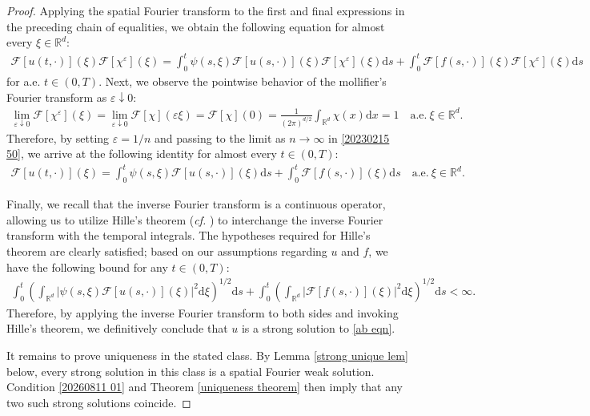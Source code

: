 \documentclass[11pt,reqno]{amsart}
\theoremstyle{definition}
\theoremstyle{remark}
\newcommand\bR{\mathbb{R}}
\newcommand\cF{\mathcal{F}}
\numberwithin{equation}{section}
\begin{document}
\begin{proof}
Applying the spatial Fourier transform to the first and final expressions in the preceding chain of equalities, we obtain the following equation for almost every $\xi \in \bR^d$:
\begin{align}
								\label{20230215 50}
\cF[u(t,\cdot)](\xi) \cF[\chi^\varepsilon](\xi)
= \int_0^t \psi(s,\xi) \cF[u(s,\cdot)](\xi)  \cF[\chi^\varepsilon](\xi) \mathrm{d}s 
+\int_0^t  \cF[f(s,\cdot)](\xi)  \cF[\chi^\varepsilon](\xi) \mathrm{d}s 
\end{align}
for a.e. $t \in (0,T)$.
Next, we observe the pointwise behavior of the mollifier's Fourier transform as $\varepsilon \downarrow 0$:
\begin{align*}
\lim_{\varepsilon \downarrow 0}\cF[\chi^\varepsilon](\xi)
=\lim_{\varepsilon \downarrow 0}\cF[\chi](\varepsilon \xi)= \cF[\chi](0)= \frac{1}{(2\pi)^{d/2}} \int_{\bR^d}\chi(x)\mathrm{d}x=1 \quad \text{a.e.}~ \xi \in \bR^d.
\end{align*}
Therefore, by setting $\varepsilon=1/n$ and passing to the limit as $n \to \infty$ in \eqref{20230215 50}, we arrive at the following identity for almost every $t \in (0,T)$:
\begin{align*}
\cF[u(t,\cdot)](\xi)
=\int_0^t \psi(s,\xi) \cF[u(s,\cdot)](\xi) \mathrm{d}s 
+\int_0^t  \cF[f(s,\cdot)](\xi) \mathrm{d}s 
\quad \text{a.e.}~ \xi \in \bR^d.
\end{align*}


Finally, we recall that the inverse Fourier transform is a continuous operator, allowing us to utilize Hille's theorem (\textit{cf.} \cite[Corollary V.5.2]{Yosida}) to interchange the inverse Fourier transform with the temporal integrals. 
The hypotheses required for Hille's theorem are clearly satisfied; based on our assumptions regarding $u$ and $f$, we have the following bound for any $t \in (0,T)$:
\begin{align*}
\int_0^t \left( \int_{\bR^d} \left|\psi(s,\xi) \cF[u(s,\cdot)](\xi) \right|^2 \mathrm{d}\xi \right)^{1/2} \mathrm{d}s 
+ \int_0^t \left( \int_{\bR^d} \left|\cF[f(s,\cdot)](\xi)\right|^2 \mathrm{d}\xi \right)^{1/2} \mathrm{d}s < \infty.
\end{align*}
Therefore, by applying the inverse Fourier transform to both sides and invoking Hille's theorem, we definitively conclude that $u$ is a strong solution to \eqref{ab eqn}.

It remains to prove uniqueness in the stated class.  By Lemma
\ref{strong unique lem} below, every strong solution in this class is a
spatial Fourier weak solution.  Condition \eqref{20260811 01} and Theorem
\ref{uniqueness theorem} then imply that any two such strong solutions
coincide.

\end{proof}
\end{document}
